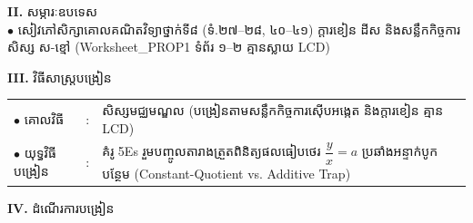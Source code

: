 \documentclass[a4paper,10pt]{article}
\newcommand{\en}[1]{{\TimesEn #1}}
\begin{document}
{%
\textbf{II.} {\muol សម្ភារៈឧបទេស}\\[1pt]
\hspace*{0.55cm}$\bullet$ \hspace{0.35cm} សៀវភៅសិក្សាគោលគណិតវិទ្យាថ្នាក់ទី៨ (ទំ.២៧–២៨, ៤០–៤១) ក្ដារខៀន ដីស និងសន្លឹកកិច្ចការសិស្ស ស-ខ្មៅ (\en{Worksheet\_PROP1} ទំព័រ ១–២ គ្មានស្លាយ \en{LCD})

\vspace{2pt}

\textbf{III.} {\muol វិធីសាស្រ្តបង្រៀន}\\[1pt]
\hspace*{0.45cm}%
\begin{tabular}{@{}l l L{14.85cm}@{}}
  $\bullet$ \hspace{0.25cm} គោលវិធី & : & សិស្សមជ្ឈមណ្ឌល (បង្រៀនតាមសន្លឹកកិច្ចការស៊ើបអង្កេត និងក្ដារខៀន គ្មាន \en{LCD}) \\
  $\bullet$ \hspace{0.25cm} យុទ្ធវិធីបង្រៀន & : & គំរូ \en{5Es} រួមបញ្ចូលតារាងត្រួតពិនិត្យផលធៀបថេរ $\dfrac{y}{x}=a$ ប្រឆាំងអន្ទាក់បូកបន្ថែម (\en{Constant-Quotient vs. Additive Trap}) \\
\end{tabular}
}

\vspace{2pt}

\textbf{IV.} {\muol ដំណើរការបង្រៀន}

\vspace{1pt}
\end{document}
